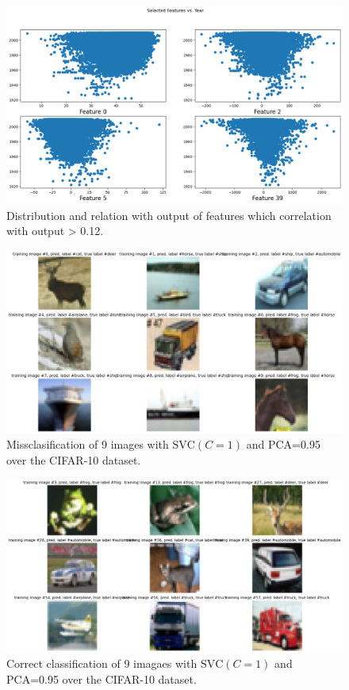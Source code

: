 \documentclass[twocolumn]{article}
\begin{document}
\begin{figure}[!htb]
    \centering
    \includegraphics[width=0.95\columnwidth]{images/songs/correlation_best_features.png}
    \caption{Distribution and relation with output of features which correlation with output > 0.12.}
    \label{fig:correlation_best_features}
\end{figure}












\begin{figure}[!htb]
    \centering
    \includegraphics[width=0.95\columnwidth]{images/CIFAR/missclasification_SVM.png}
    \caption{Missclasification of 9 images with $\text{SVC}(C=1)$ and PCA=0.95 over the CIFAR-10 dataset.}
    \label{fig:missclasification_SVM}
\end{figure}

\begin{figure}[!htb]
    \centering
    \includegraphics[width=0.95\columnwidth]{images/CIFAR/succes_classification_CIFAR.png}
    \caption{Correct classification of 9 imagaes with $\text{SVC}(C=1)$ and PCA=0.95 over the CIFAR-10 dataset.}
    \label{fig:polynomial_data}
\end{figure}
\end{document}
